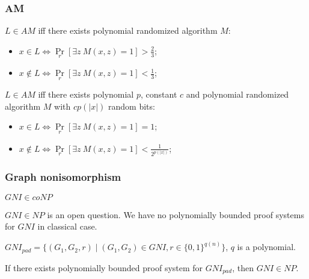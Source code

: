 \begin{frame}
    \frametitle{AM}
    
    \begin{definition}
    	$L \in AM$ iff there exists polynomial randomized algorithm
        $M$:
        \begin{itemize}
			\item $x \in L \Leftrightarrow
        		\Pr\limits_{r}[\exists z~ M(x, z) = 1] 
        		> \frac{2}{3}$;
            \item $x \notin L \Leftrightarrow
        		\Pr\limits_{r}[\exists z~ M(x, z) = 1] 
        		< \frac{1}{3}$;
        \end{itemize}
    \end{definition}

    \pause
    \begin{theorem}
        $L \in AM$ iff there exists polynomial $p$, constant $c$ and
        polynomial randomized algorithm $M$ with $c p(|x|)$ random
        bits:
        \begin{itemize}
			\item $x \in L \Leftrightarrow
        		\Pr\limits_{r}[\exists z~ M(x, z) = 1] = 1$;
            \item $x \notin L \Leftrightarrow
        		\Pr\limits_{r}[\exists z~ M(x, z) = 1] 
        		< \frac{1}{2^{p(|x|)}}$;
        \end{itemize}
    \end{theorem}
\end{frame}

\begin{frame}
    \frametitle{Graph nonisomorphism}

    $GNI \in coNP$
    
    $GNI \in NP$ is an open question. We have no polynomially bounded proof systems
    for $GNI$ in classical case.

	\pause
    \begin{definition}
        $GNI_{pad} = \{(G_1, G_2, r) \mid (G_1, G_2) \in GNI,
        r \in \{0, 1\}^{q(n)}\}$, $q$ is a polynomial.
    \end{definition}

    \pause
    \begin{lemma}
        If there exists polynomially bounded proof system for
        $GNI_{pad}$, then $GNI \in NP$.
    \end{lemma}
\end{frame}

